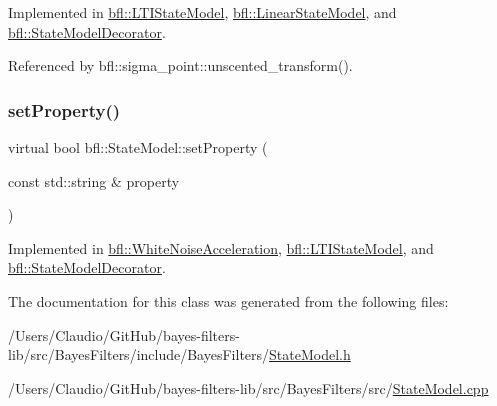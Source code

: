 Implemented in \mbox{\hyperlink{classbfl_1_1LTIStateModel_a0a736ef66903c2e598f0b86892a716aa}{bfl\+::\+L\+T\+I\+State\+Model}}, \mbox{\hyperlink{classbfl_1_1LinearStateModel_a7823383ddc1ed709b9399c712997f512}{bfl\+::\+Linear\+State\+Model}}, and \mbox{\hyperlink{classbfl_1_1StateModelDecorator_a9548415d6445c58778eeeadf48ff2672}{bfl\+::\+State\+Model\+Decorator}}.



Referenced by bfl\+::sigma\+\_\+point\+::unscented\+\_\+transform().

\mbox{\label{classbfl_1_1StateModel_ac86dcdad8f0bbfab39a23e592779feaa}} 
\subsubsection{\texorpdfstring{set\+Property()}{setProperty()}}
{\footnotesize\ttfamily virtual bool bfl\+::\+State\+Model\+::set\+Property (\begin{DoxyParamCaption}\item[{const std\+::string \&}]{property }\end{DoxyParamCaption})\hspace{0.3cm}{\ttfamily [pure virtual]}}



Implemented in \mbox{\hyperlink{classbfl_1_1WhiteNoiseAcceleration_a0203b47074e0680852f53dcba8a7a627}{bfl\+::\+White\+Noise\+Acceleration}}, \mbox{\hyperlink{classbfl_1_1LTIStateModel_afc2264780111fe41b6a82e97bcb5e87c}{bfl\+::\+L\+T\+I\+State\+Model}}, and \mbox{\hyperlink{classbfl_1_1StateModelDecorator_ad292f3b665c1adf20a1f32dc8a065fec}{bfl\+::\+State\+Model\+Decorator}}.



The documentation for this class was generated from the following files\+:\begin{DoxyCompactItemize}
\item 
/\+Users/\+Claudio/\+Git\+Hub/bayes-\/filters-\/lib/src/\+Bayes\+Filters/include/\+Bayes\+Filters/\mbox{\hyperlink{StateModel_8h}{State\+Model.\+h}}\item 
/\+Users/\+Claudio/\+Git\+Hub/bayes-\/filters-\/lib/src/\+Bayes\+Filters/src/\mbox{\hyperlink{StateModel_8cpp}{State\+Model.\+cpp}}\end{DoxyCompactItemize}
